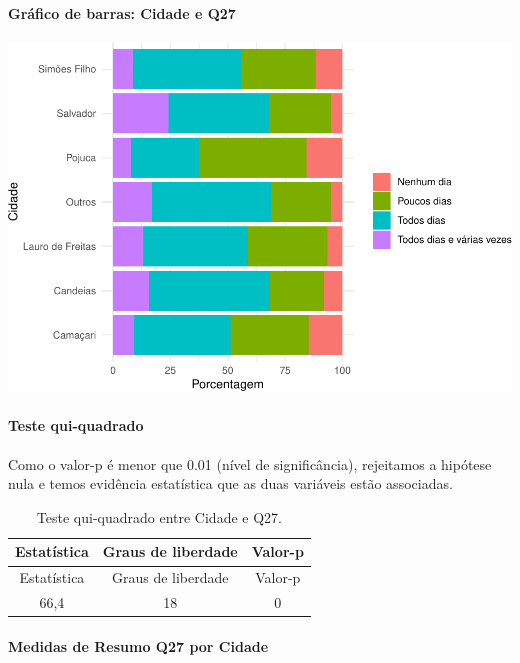 \documentclass[]{article}
\let\oldparagraph\paragraph
\renewcommand{\paragraph}[1]{\oldparagraph{#1}\mbox{}}
\begin{document}
\hypertarget{gruxe1fico-de-barras-cidade-e-q27}{%
\paragraph{Gráfico de barras: Cidade e Q27}\label{gruxe1fico-de-barras-cidade-e-q27}}

\begin{center}\includegraphics[width=0.75\linewidth]{relatorio_covid19_files/figure-latex/unnamed-chunk-781-1} \end{center}

\hypertarget{teste-qui-quadrado-67}{%
\paragraph{Teste qui-quadrado}\label{teste-qui-quadrado-67}}

Como o valor-p é menor que 0.01 (nível de significância), rejeitamos a hipótese nula e temos evidência estatística que as duas variáveis estão associadas.

\begin{longtable}[]{@{}ccc@{}}
\caption{\label{tab:unnamed-chunk-783}Teste qui-quadrado entre Cidade e Q27.}\tabularnewline
\toprule
Estatística & Graus de liberdade & Valor-p\tabularnewline
\midrule
\endfirsthead
\toprule
Estatística & Graus de liberdade & Valor-p\tabularnewline
\midrule
\endhead
66,4 & 18 & 0\tabularnewline
\bottomrule
\end{longtable}

\cleardoublepage

\hypertarget{medidas-de-resumo-q27-por-cidade}{%
\paragraph{Medidas de Resumo Q27 por Cidade}\label{medidas-de-resumo-q27-por-cidade}}
\end{document}
